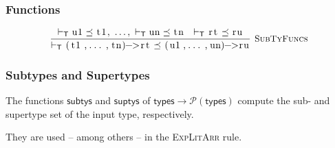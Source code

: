 \documentclass{article}
\newcommand{\code}[1]{\lstinline[columns=fixed]{#1}}
\newcommand{\drmrule}[5]{\frac{#1}{#2\vdash_{\mathsf{#3}}#4}\textsc{\ \small{#5}}}
\newcommand{\ruleapp}[1]{\vdash_{\mathsf{#1}}}
\newcommand{\mc}[1]{\textnormal{\code{#1}}}
\begin{document}
			\subsubsection{Functions}
			
				\begin{align*}
					\drmrule{\ruleapp{T}\mc{u1}\preceq\mc{t1},\ \dots,\ \ruleapp{T}\mc{un}\preceq\mc{tn}\ \ \ruleapp{T}\mc{rt}\preceq\mc{ru}}{}{T}{\mc{(t1,...,tn)->rt} \preceq \mc{(u1,...,un)->ru}}{SubTyFuncs}
				\end{align*}
				
			\subsubsection{Subtypes and Supertypes}
			
				The functions $\mathsf{subtys}$ and $\mathsf{suptys}$ of $\mathsf{types}\to\mathcal{P}(\mathsf{types})$ compute the sub- and supertype set of the input type, respectively.
				
				They are used -- among others -- in the \textsc{ExpLitArr} rule.
				
\end{document}

